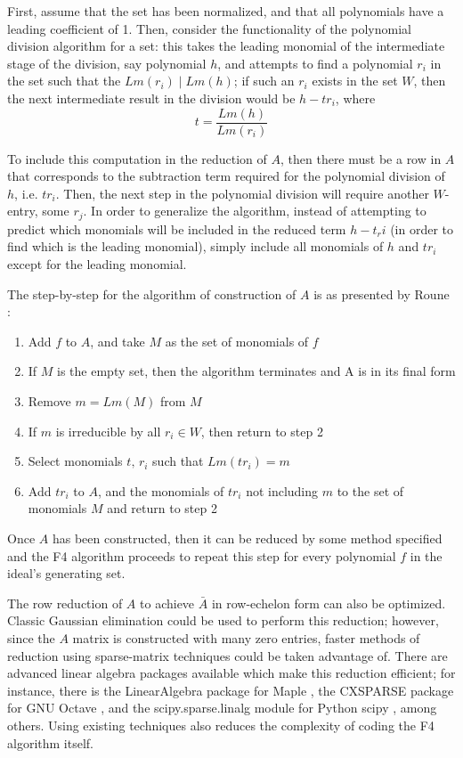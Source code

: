 \documentclass[letterpaper,12pt,titlepage,oneside,final]{book}
\begin{document}
First, assume that the set has been normalized, and that all polynomials have a leading coefficient of 1.  Then, consider the functionality of the polynomial division algorithm for a set: this takes the leading monomial of the intermediate stage of the division, say polynomial ${h}$, and attempts to find a polynomial ${r_i}$ in the set such that the ${Lm(r_i) \mid Lm(h)}$; if such an ${r_i}$ exists in the set ${W}$, then the next intermediate result in the division would be ${h - tr_i}$, where $${t = \frac{Lm(h)}{Lm(r_i)}}$$  

To include this computation in the reduction of ${A}$, then there must be a row in ${A}$ that corresponds to the subtraction term required for the polynomial division of ${h}$, i.e. ${tr_i}$.  Then, the next step in the polynomial division will require another ${W}$-entry, some ${r_j}$.  In order to generalize the algorithm, instead of attempting to predict which monomials will be included in the reduced term ${h - t_ri}$ (in order to find which is the leading monomial), simply include all monomials of ${h}$ and ${tr_i}$ except for the leading monomial.

The step-by-step for the algorithm of construction of ${A}$ is as presented by Roune \cite{Roune}:
\begin{enumerate}
  \item Add ${f}$ to ${A}$, and take ${M}$ as the set of monomials of ${f}$
  \item If ${M}$ is the empty set, then the algorithm terminates and A is in its final form
  \item Remove $m = {Lm(M)}$ from ${M}$
  \item If ${m}$ is irreducible by all ${r_i \in W}$, then return to step 2
  \item Select monomials ${t,\, r_i}$ such that ${Lm(tr_i) = m}$
  \item Add ${tr_i}$ to ${A}$, and the monomials of ${tr_i}$ not including ${m}$ to the set of monomials ${M}$ and return to step 2
\end{enumerate}

Once ${A}$ has been constructed, then it can be reduced by some method specified and the F4 algorithm proceeds to repeat this step for every polynomial ${f}$ in the ideal's generating set.

The row reduction of ${A}$ to achieve ${\bar A}$ in row-echelon form can also be optimized.  Classic Gaussian elimination could be used to perform this reduction; however, since the ${A}$ matrix is constructed with many zero entries, faster methods of reduction using sparse-matrix techniques could be taken advantage of.  There are advanced linear algebra packages available which make this reduction efficient; for instance, there is the LinearAlgebra package for Maple \cite{MapleLinAlg}, the CXSPARSE package for GNU Octave \cite{OctaveLinAlg}, and the scipy.sparse.linalg module for Python scipy \cite{scipyLinAlg}, among others.  Using existing techniques also reduces the complexity of coding the F4 algorithm itself.  
\end{document}
